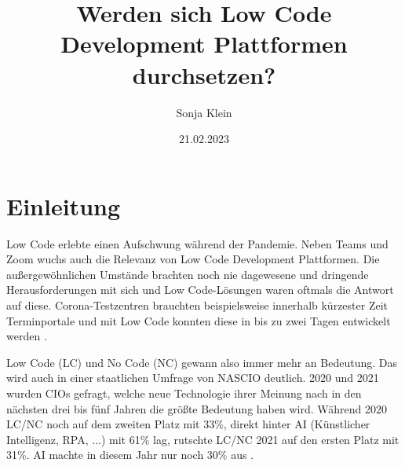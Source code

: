 \documentclass[12pt]{article} %
\title{Werden sich Low Code Development Plattformen durchsetzen?}
\author{Sonja Klein}
\date{21.02.2023}
\begin{document}
	
	

	
	\maketitle	
	\newpage
	\tableofcontents
	\newpage
	
	\section{Einleitung}
	Low Code erlebte einen Aufschwung während der Pandemie. Neben Teams und Zoom wuchs auch die Relevanz von Low Code Development Plattformen. Die außergewöhnlichen Umstände brachten noch nie dagewesene und dringende Herausforderungen mit sich und Low Code-Lösungen waren oftmals die Antwort auf diese. Corona-Testzentren brauchten beispielsweise innerhalb kürzester Zeit Terminportale und mit Low Code konnten diese in bis zu zwei Tagen entwickelt werden \autocite{AmyGlasscock.2021}. \newline 
	
	Low Code (LC) und No Code (NC) gewann also immer mehr an Bedeutung. Das wird auch in einer staatlichen Umfrage von NASCIO deutlich. 2020 und 2021 wurden CIOs gefragt, welche neue Technologie ihrer Meinung nach in den nächsten drei bis fünf Jahren die größte Bedeutung haben wird. Während 2020 LC/NC noch auf dem zweiten Platz mit 33\%, direkt hinter AI (Künstlicher Intelligenz, RPA, ...) mit 61\% lag, rutschte LC/NC 2021 auf den ersten Platz mit 31\%. AI machte in diesem Jahr nur noch 30\% aus \autocite{AmyGlasscock.2021}.
	
\end{document}
